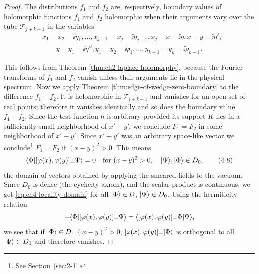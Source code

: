 \begin{proof}
The distributions $f_1$ and $f_2$ are, respectively, boundary values of
holomorphic functions $f_1$ and $f_2$ holomorphic when their arguments vary
over the tube $\mathcal{T}_{j+k+1}$ in the variables
\begin{equation*}
\begin{aligned}
 &x_1-x_2-\ii\eta_1,\ldots,x_{j-1}-x_j-\ii\eta_{j-1},x_j-x-\ii\eta,
   x-y-\ii\eta',\\
 &\qquad y-y_1-\ii\eta'',y_1-y_2-\ii\rho_1,\ldots,
   y_{k-1}-y_k-\ii\rho_{k-1}.
\end{aligned}
\end{equation*}

This follows from Theorem \ref{thm:ch2-laplace-holomorphy}, because the Fourier transforms of $f_1$ and
$f_2$ vanish unless their arguments lie in the physical spectrum. Now we apply
Theorem \ref{thm:edge-of-wedge-zero-boundary} to the difference $f_1-f_2$. It is holomorphic in
$\mathcal{T}_{j+k+1}$ and vanishes for an open set of real points; therefore it
vanishes identically and so does the boundary value $f_1-f_2$. Since the test
function $h$ is arbitrary provided its support $K$ lies in a sufficiently small
neighborhood of $x'-y'$, we conclude $F_1=F_2$ in some neighborhood of $x'-y'$.
Since $x'-y'$ was an arbitrary space-like vector we conclude\footnote{%
See Section~\ref{sec:2-1}.} $F_1=F_2$ if $(x-y)^2>0$. This means
\begin{equation}
  \langle \Phi\vert [\varphi(x),\varphi(y)]_-\Psi\rangle=0
  \quad\text{for }(x-y)^2>0,\quad \lvert \Psi\rangle,\lvert \Phi\rangle\in D_0,
  \tag{4-8}\label{eq:ch4-locality-domain}
\end{equation}
the domain of vectors obtained by applying the smeared fields to the vacuum.
Since $D_0$ is dense (the cyclicity axiom), and the scalar product is
continuous, we get \eqref{eq:ch4-locality-domain} for all $\lvert \Phi\rangle\in D$, $\lvert \Psi\rangle\in D_0$.
Using the hermiticity relation
\begin{equation*}
 -\langle \Phi\vert [\varphi(x),\varphi(y)]_-\Psi\rangle
 =\langle [\varphi(x),\varphi(y)]_-\Phi\vert \Psi\rangle,
\end{equation*}
we see that if $\lvert \Phi\rangle\in D$, $(x-y)^2>0$,
$[\varphi(x),\varphi(y)]_-\lvert \Phi\rangle$ is orthogonal to all
$\lvert \Psi\rangle\in D_0$ and therefore vanishes.
\end{proof}
